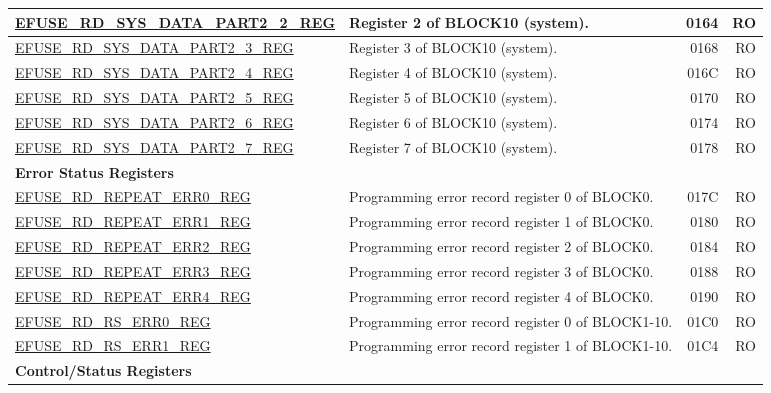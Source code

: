 \begin{longtable}{ | m{6cm} | m{7.2cm} | r| r | }
\hyperref[regdesc:EFUSERDSYSDATAPART2NREG]{EFUSE\_RD\_SYS\_DATA\_PART2\_2\_REG} & Register 2 of BLOCK10 (system). & \hexprefix{}0164 & RO \\ \hline
\hyperref[regdesc:EFUSERDSYSDATAPART2NREG]{EFUSE\_RD\_SYS\_DATA\_PART2\_3\_REG} & Register 3 of BLOCK10 (system). & \hexprefix{}0168 & RO \\ \hline
\hyperref[regdesc:EFUSERDSYSDATAPART2NREG]{EFUSE\_RD\_SYS\_DATA\_PART2\_4\_REG} & Register 4 of BLOCK10 (system). & \hexprefix{}016C & RO \\ \hline
\hyperref[regdesc:EFUSERDSYSDATAPART2NREG]{EFUSE\_RD\_SYS\_DATA\_PART2\_5\_REG} & Register 5 of BLOCK10 (system). & \hexprefix{}0170 & RO \\ \hline
\hyperref[regdesc:EFUSERDSYSDATAPART2NREG]{EFUSE\_RD\_SYS\_DATA\_PART2\_6\_REG} & Register 6 of BLOCK10 (system). & \hexprefix{}0174 & RO \\ \hline
\hyperref[regdesc:EFUSERDSYSDATAPART2NREG]{EFUSE\_RD\_SYS\_DATA\_PART2\_7\_REG} & Register 7 of BLOCK10 (system). & \hexprefix{}0178 & RO \\ \hline
\multicolumn{4}{|l|}{\textbf{Error Status Registers}} \\ \hline
\hyperref[regdesc:EFUSERDREPEATERR0REG]{EFUSE\_RD\_REPEAT\_ERR0\_REG} & Programming error record register 0 of BLOCK0. & \hexprefix{}017C & RO \\ \hline
\hyperref[regdesc:EFUSERDREPEATERR1REG]{EFUSE\_RD\_REPEAT\_ERR1\_REG} & Programming error record register 1 of BLOCK0. & \hexprefix{}0180 & RO \\ \hline
\hyperref[regdesc:EFUSERDREPEATERR2REG]{EFUSE\_RD\_REPEAT\_ERR2\_REG} & Programming error record register 2 of BLOCK0. & \hexprefix{}0184 & RO \\ \hline
\hyperref[regdesc:EFUSERDREPEATERR3REG]{EFUSE\_RD\_REPEAT\_ERR3\_REG} & Programming error record register 3 of BLOCK0. & \hexprefix{}0188 & RO \\ \hline
\hyperref[regdesc:EFUSERDREPEATERR4REG]{EFUSE\_RD\_REPEAT\_ERR4\_REG} & Programming error record register 4 of BLOCK0. & \hexprefix{}0190 & RO \\ \hline
\hyperref[regdesc:EFUSERDRSERR0REG]{EFUSE\_RD\_RS\_ERR0\_REG} & Programming error record register 0 of BLOCK1-10. & \hexprefix{}01C0 & RO \\ \hline
\hyperref[regdesc:EFUSERDRSERR1REG]{EFUSE\_RD\_RS\_ERR1\_REG} & Programming error record register 1 of BLOCK1-10. & \hexprefix{}01C4 & RO \\ \hline
\multicolumn{4}{|l|}{\textbf{Control/Status Registers}} \\\hline

\end{longtable}
